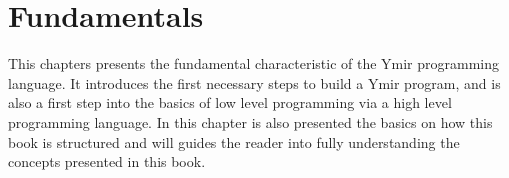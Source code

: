 \chapter{Fundamentals}
\nopagecolor{}

This chapters presents the fundamental characteristic of the Ymir programming
language. It introduces the first necessary steps to build a Ymir program, and
is also a first step into the basics of low level programming via a high level
programming language. In this chapter is also presented the basics on how this
book is structured and will guides the reader into fully understanding the
concepts presented in this book.

\minitoc%

